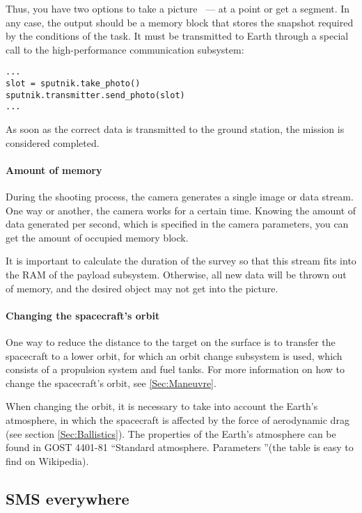 \documentclass[12pt,a4paper]{article}
\begin{document}
Thus, you have two options to take a picture ~--- at a point or get a segment. In any case, the output should be a memory block that stores the snapshot required by the conditions of the task. It must be transmitted to Earth through a special call to the high-performance communication subsystem:

\begin{verbatim}
...
slot = sputnik.take_photo()
sputnik.transmitter.send_photo(slot)
...
\end{verbatim}

As soon as the correct data is transmitted to the ground station, the mission is considered completed.

\paragraph{Amount of memory}

During the shooting process, the camera generates a single image or data stream. One way or another, the camera works for a certain time. Knowing the amount of data generated per second, which is specified in the camera parameters, you can get the amount of occupied memory block.

It is important to calculate the duration of the survey so that this stream fits into the RAM of the payload subsystem. Otherwise, all new data will be thrown out of memory, and the desired object may not get into the picture.

\paragraph{Changing the spacecraft's orbit}

One way to reduce the distance to the target on the surface is to transfer the spacecraft to a lower orbit, for which an orbit change subsystem is used, which consists of a propulsion system and fuel tanks. For more information on how to change the spacecraft's orbit, see \ref{Sec:Maneuvre}.

When changing the orbit, it is necessary to take into account the Earth's atmosphere, in which the spacecraft is affected by the force of aerodynamic drag (see section \ref{Sec:Ballistics}). The properties of the Earth's atmosphere can be found in GOST 4401-81 “Standard atmosphere. Parameters ”(the table is easy to find on Wikipedia).

\clearpage
\subsection{SMS everywhere}
\end{document}
